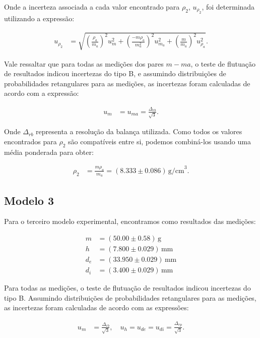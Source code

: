 \documentclass{article}
\begin{document}
\begin{multicols}{2}
Onde a incerteza associada a cada valor encontrado para $\rho_2$, $u_{\rho_2}$, foi determinada utilizando a expressão:

\begin{align}
u_{\rho_2} &= \sqrt{\left(\frac{\rho_a}{m_a}\right)^2 u^2_m + \left(\frac{-m\rho_a}{m^2_a}\right)^2 u^2_{m_a}+\left(\frac{m}{m_a}\right)^2 u^2_{\rho_a}}.
\end{align}

Vale ressaltar que para todas as medições dos pares $m-ma$, o teste de flutuação de resultados indicou incertezas do tipo B, e assumindo distribuições de probabilidades retangulares para as medições, as incertezas foram calculadas de acordo com a expressão:

\begin{align}
u_m &= u_{ma} = \frac{\Delta_{rb}}{\sqrt{3}}.
\end{align}

Onde $\Delta_{rb}$ representa a resolução da balança utilizada. Como todos os valores encontrados para $\rho_2$ são compatíveis entre si, podemos combiná-los usando uma média ponderada para obter:

\begin{align}
\rho_2 &= \frac{m\rho_a}{m_a} = (8.333 \pm 0.086) \, \text{g/cm}^3.
\end{align}

\subsection{Modelo 3}

Para o terceiro modelo experimental, encontramos como resultados das medições:

\begin{align*}
m &= (50.00 \pm 0.58) \, \text{g} \\
h &= (7.800 \pm 0.029) \, \text{mm} \\
d_e &= (33.950 \pm 0.029) \, \text{mm} \\
d_i &= (3.400 \pm 0.029) \, \text{mm}
\end{align*}

Para todas as medições, o teste de flutuação de resultados indicou incertezas do tipo B. Assumindo distribuições de probabilidades retangulares para as medições, as incertezas foram calculadas de acordo com as expressões:

\begin{align}
u_m &= \frac{\Delta_{rb}}{\sqrt{3}}, \quad u_h = u_{de} = u_{di} = \frac{\Delta_{rp}}{\sqrt{3}}.
\end{align}


\end{multicols}
\end{document}
